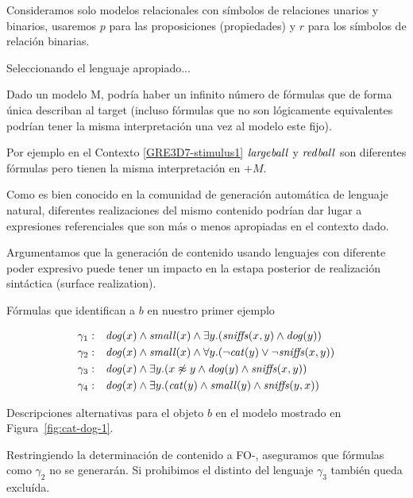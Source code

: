 
Consideramos solo modelos relacionales con s\'imbolos de relaciones unarios y binarios, usaremos $p$ para las proposiciones (propiedades) y $r$ para los s\'imbolos de relaci\'on binarias.


Seleccionando el lenguaje apropiado...

Dado un modelo M, podr\'ia haber un infinito n\'umero de f\'ormulas que de forma \'unica
describan al target (incluso f\'ormulas que no son l\'ogicamente equivalentes podr\'ian tener
la misma interpretaci\'on una vez al modelo este fijo). 


Por ejemplo en el Contexto \ref{GRE3D7-stimulus1} $\mathit{large} \mathit{ball}$ y $\mathit{red} \mathit{ball}$ son diferentes f\'ormulas pero tienen la misma interpretaci\'on en $+M$.

Como es bien conocido en la comunidad de generaci\'on autom\'atica de lenguaje natural, diferentes
realizaciones del mismo contenido podr\'ian dar lugar a expresiones referenciales que son m\'as o menos
apropiadas en el contexto dado. 

Argumentamos que la generaci\'on de contenido usando lenguajes con diferente poder expresivo puede tener un impacto en la estapa posterior
de realizaci\'on sint\'actica (surface realization).

F\'ormulas que identifican a $b$ en nuestro primer ejemplo

\begin{table}
$$
\begin{array}{cl}
 \gamma_1: & \mathit{dog}(x) \land \mathit{small}(x) \land
   \exists y . (\mathit{sniffs}(x,y) \land \mathit{dog}(y))\\[3pt]
  \gamma_2: & \mathit{dog}(x) \land \mathit{small}(x) \land
  \forall y . (\neg \mathit{cat}(y) \lor \neg \mathit{sniffs}(x,y))\\[3pt]
  \gamma_3: & \mathit{dog}(x) \land
  \exists y . (x \not\approx y \land \mathit{dog}(y)  \land \mathit{sniffs}(x,y))\\[3pt]
  \gamma_4: & \mathit{dog}(x) \land
  \exists y . (\mathit{cat}(y) \land \mathit{small}(y) \land \mathit{sniffs}(y,x))
 \end{array}
$$
\caption{Descripciones alternativas para el objeto $b$ en el modelo mostrado en Figura~\ref{fig:cat-dog-1}.}\label{tab:gammas}
\end{table}

Restringiendo la determinaci\'on de contenido a FO-, aseguramos que f\'ormulas como  $\gamma_2$ no se generar\'an. Si prohibimos el distinto del lenguaje  $\gamma_3$ tambi\'en queda exclu\'ida.

